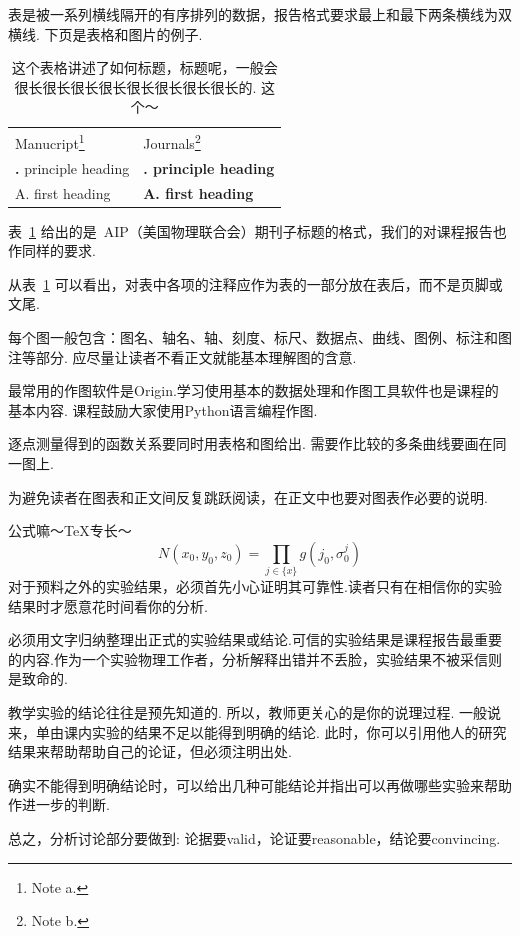 \documentclass[aps,pre,12pt,preprint,onecolumn,showpacs,showkeys]{revtex4-1}
\begin{document}
表是被一系列横线隔开的有序排列的数据，报告格式要求最上和最下两条横线为双横线. 下页是表格和图片的例子.\par

\begin{table}[t]
\caption{\label{tab:table1}%
这个表格讲述了如何标题，标题呢，一般会很长很长很长很长很长很长很长很长的. 这个～}
\begin{ruledtabular}
\begin{tabular}{ll}
Manucript\footnote{Note a.} & Journals\footnote{Note b.} \\
\colrule
{\bf\uppercase\expandafter{\romannumeral 1}.} principle heading & {\bf\uppercase\expandafter{\romannumeral 1}. principle heading} \\
A. first heading & {\bf A. first heading} \\
\end{tabular}
\end{ruledtabular}
\end{table}

表~\ref{tab:table1} 给出的是~AIP（美国物理联合会）期刊子标题的格式，我们的对课程报告也作同样的要求.\par
从表~\ref{tab:table1} 可以看出，对表中各项的注释应作为表的一部分放在表后，而不是页脚或文尾.\par
每个图一般包含：图名、轴名、轴、刻度、标尺、数据点、曲线、图例、标注和图注等部分. 应尽量让读者不看正文就能基本理解图的含意.\par
最常用的作图软件是Origin.学习使用基本的数据处理和作图工具软件也是课程的基本内容. 课程鼓励大家使用Python语言编程作图.\par
逐点测量得到的函数关系要同时用表格和图给出. 需要作比较的多条曲线要画在同一图上.\par
为避免读者在图表和正文间反复跳跃阅读，在正文中也要对图表作必要的说明.\par
公式嘛～TeX专长～
\begin{equation}
N(x_0,y_0,z_0)=\prod_{j\in\{x\}}g(j_0,\sigma^j_0) \label{eq:1}
\end{equation}
对于预料之外的实验结果，必须首先小心证明其可靠性.读者只有在相信你的实验结果时才愿意花时间看你的分析.\par
必须用文字归纳整理出正式的实验结果或结论.可信的实验结果是课程报告最重要的内容.作为一个实验物理工作者，分析解释出错并不丢脸，实验结果不被采信则是致命的.\par
教学实验的结论往往是预先知道的. 所以，教师更关心的是你的说理过程. 一般说来，单由课内实验的结果不足以能得到明确的结论. 此时，你可以引用他人的研究结果来帮助帮助自己的论证，但必须注明出处. \par
确实不能得到明确结论时，可以给出几种可能结论并指出可以再做哪些实验来帮助作进一步的判断.\par
总之，分析讨论部分要做到: 论据要valid，论证要reasonable，结论要convincing.\par
\end{document}
